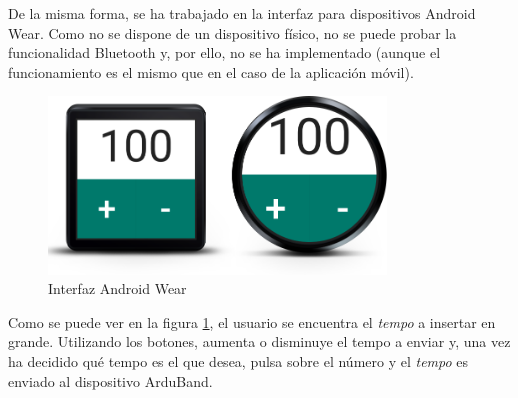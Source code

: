 De la misma forma, se ha trabajado en la interfaz para dispositivos Android Wear.
Como no se dispone de un dispositivo físico, no se puede probar la funcionalidad
Bluetooth y, por ello, no se ha implementado (aunque el funcionamiento es el mismo que
en el caso de la aplicación móvil).\\

\begin{figure}[!htb]
\centering
\includegraphics[width=0.8\textwidth]{./imagenes/androidwear}
\caption{Interfaz Android Wear} \label{fig:androidwearUI}
\end{figure}

Como se puede ver en la figura \ref{fig:androidwearUI}, el usuario se encuentra el
\textit{tempo} a insertar en grande. Utilizando los botones, aumenta o disminuye el tempo a
enviar y, una vez ha decidido qué tempo es el que desea, pulsa sobre el número y
el \textit{tempo} es enviado al dispositivo ArduBand.\\
